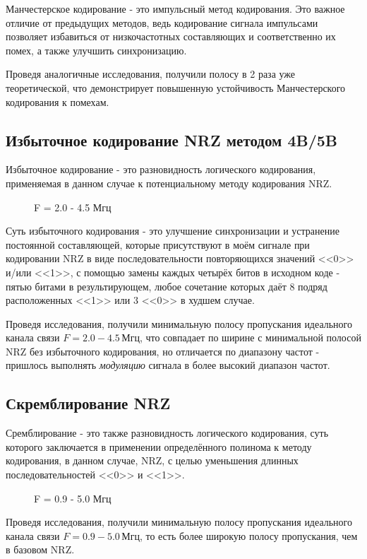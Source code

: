 \vspace{-0mm}
Манчестерское кодирование - это импульсный метод кодирования. Это важное отличие от предыдущих методов, ведь кодирование сигнала импульсами позволяет избавиться от низкочастотных составляющих и соответственно их помех, а также улучшить синхронизацию.

Проведя аналогичные исследования, получили полосу в 2 раза уже теоретической, что демонстрирует повышенную устойчивость Манчестерского кодирования к помехам.

\subsection{Избыточное кодирование NRZ методом 4B/5B}

\newsavebox{\picbox}

Избыточное кодирование - это разновидность логического кодирования, применяемая в данном случае к потенциальному методу кодирования NRZ.

\begin{wrapfigure}{r}{0.6\textwidth}
	\centering
	\caption{F =  2.0 - 4.5 Мгц}
\end{wrapfigure}


Суть избыточного кодирования - это улучшение синхронизации и устранение постоянной составляющей, которые присутствуют в моём сигнале при кодировании NRZ в виде последовательности повторяющихся значений <<0>> и/или <<1>>, с помощью замены каждых четырёх битов в исходном коде - пятью битами в результирующем, любое сочетание которых даёт 8 подряд расположенных <<1>> или 3 <<0>> в худшем случае.

Проведя исследования, получили минимальную полосу пропускания идеального канала связи $F = 2.0 - 4.5 \, \text{Мгц}$, что совпадает по ширине с минимальной полосой NRZ без избыточного кодирования, но отличается по диапазону частот - пришлось выполнять \textit{модуляцию} сигнала в более высокий диапазон частот.

\subsection{Скремблирование NRZ}

Сремблирование -  это также разновидность логического кодирования, суть которого заключается в применении определённого полинома к методу кодирования, в данном случае, NRZ, с целью уменьшения длинных последовательностей <<0>> и <<1>>.

\begin{wrapfigure}{r}{0.58\textwidth}
	\centering
	\caption{F =  0.9 - 5.0 Мгц}
\end{wrapfigure}

Проведя исследования, получили минимальную полосу пропускания идеального канала связи $F = 0.9 - 5.0 \, \text{Мгц}$, то есть более широкую полосу пропускания, чем в базовом NRZ.
